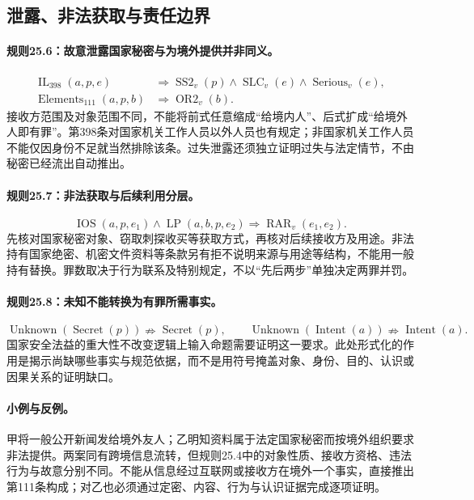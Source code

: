 \subsection{泄露、非法获取与责任边界}
\paragraph{规则25.6：故意泄露国家秘密与为境外提供并非同义。}
\[
\begin{aligned}
\operatorname{IL}_{398}(a,p,e)
&\Rightarrow\operatorname{SS2}_v(p)
\land\operatorname{SLC}_v(e)
\land\operatorname{Serious}_v(e),\\
\operatorname{Elements}_{111}(a,p,b)
&\Rightarrow\operatorname{OR2}_v(b).
\end{aligned}
\]
接收方范围及对象范围不同，不能将前式任意缩成“给境内人”、后式扩成“给境外人即有罪”。第398条对国家机关工作人员以外人员也有规定；非国家机关工作人员不能仅因身份不足就当然排除该条。过失泄露还须独立证明过失与法定情节，不由秘密已经流出自动推出。

\paragraph{规则25.7：非法获取与后续利用分层。}
\[
\operatorname{IOS}(a,p,e_1)
\land\operatorname{LP}(a,b,p,e_2)
\Rightarrow\operatorname{RAR}_v(e_1,e_2).
\]
先核对国家秘密对象、窃取刺探收买等获取方式，再核对后续接收方及用途。非法持有国家绝密、机密文件资料等条款另有拒不说明来源与用途等结构，不能用一般持有替换。罪数取决于行为联系及特别规定，不以“先后两步”单独决定两罪并罚。

\paragraph{规则25.8：未知不能转换为有罪所需事实。}
\[
\operatorname{Unknown}(\operatorname{Secret}(p))
\nRightarrow\operatorname{Secret}(p),\qquad
\operatorname{Unknown}(\operatorname{Intent}(a))
\nRightarrow\operatorname{Intent}(a).
\]
国家安全法益的重大性不改变逻辑上输入命题需要证明这一要求。此处形式化的作用是揭示尚缺哪些事实与规范依据，而不是用符号掩盖对象、身份、目的、认识或因果关系的证明缺口。

\paragraph{小例与反例。}
甲将一般公开新闻发给境外友人；乙明知资料属于法定国家秘密而按境外组织要求非法提供。两案同有跨境信息流转，但规则25.4中的对象性质、接收方资格、违法行为与故意分别不同。不能从信息经过互联网或接收方在境外一个事实，直接推出第111条构成；对乙也必须通过定密、内容、行为与认识证据完成逐项证明。

